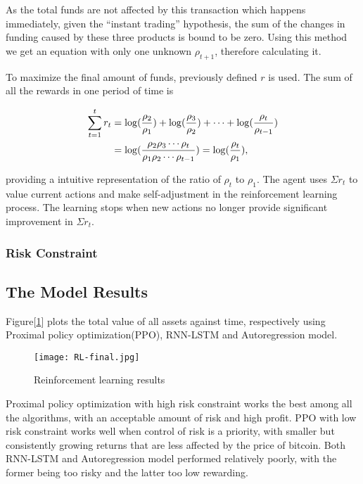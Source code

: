 \documentclass{mcmthesis}
\begin{document}
As the total funds are not affected by this transaction which happens immediately,
given the ``instant trading'' hypothesis,
the sum of the changes in funding caused by these three products is bound to be zero.
Using this method we get an equation with only one unknown $\rho _{t+1}$,
therefore calculating it.

To maximize the final amount of funds,
previously defined $r$ is used.
The sum of all the rewards in one period of time is


\begin{align}
  \sum_{t=1}^t r_t &= \log(\frac{\rho_2}{\rho_1}) + \log(\frac{\rho_3}{\rho_2}) + \cdots + \log(\frac{\rho_t}{\rho_{t-1}}) \notag \\
  &= \log(\frac{\rho_2 \rho_3 \cdots \rho_t}{\rho_1 \rho_2 \cdots \rho_{t-1}}) = \log(\frac{\rho_t}{\rho_1}),
\end{align}

providing a intuitive representation of the ratio of $\rho_t$ to $\rho_1$.
The agent uses $\Sigma r_t$ to value current actions and make self-adjustment
in the reinforcement learning process.
The learning stops when new actions no longer provide significant improvement in $\Sigma r_t$.

\subsubsection{Risk Constraint}

\lipsum[45]

\subsection{The Model Results}

Figure[\ref{RL-Results}] plots the total value of all assets against time,
respectively using Proximal policy optimization(PPO), RNN-LSTM and Autoregression model.

\begin{figure}[h]
  \small
  \centering
  \texttt{[image: RL-final.jpg]}
  \caption{Reinforcement learning results} \label{RL-Results}
\end{figure}

Proximal policy optimization with high risk constraint works the best among all the algorithms, with an acceptable amount of risk and high profit. PPO with low risk constraint works well when control of risk is a priority, with smaller but consistently growing returns that are less affected by the price of bitcoin. Both RNN-LSTM and Autoregression model performed relatively poorly, with the former being too risky and the latter too low rewarding.
\end{document}
